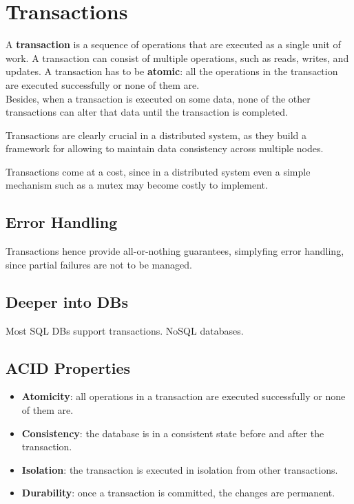 \chapter{Transactions}

\begin{definition}
   [Transaction]
   A \textbf{transaction} is a sequence of operations that are executed as a single unit of work. A transaction can consist of multiple operations, such as reads, writes, and updates.
   A transaction has to be \textbf{atomic}: all the operations in the transaction are executed successfully or none of them are.\\
   Besides, when a transaction is executed on some data, none of the other transactions can alter that data until the transaction is completed.
\end{definition}

Transactions are clearly crucial in a distributed system, as they build a framework for allowing to maintain data consistency across multiple nodes.



Transactions come at a cost, since in a distributed system even a simple mechanism such as a mutex may become costly to implement.

\section{Error Handling}
Transactions hence provide all-or-nothing guarantees, simplyfing error handling, since partial failures are not to be managed.


\section{Deeper into DBs}

Most SQL DBs support transactions.
NoSQL databases.

\section{ACID Properties}

\begin{itemize}
    \item \textbf{Atomicity}: all operations in a transaction are executed successfully or none of them are.
    \item \textbf{Consistency}: the database is in a consistent state before and after the transaction.
    \item \textbf{Isolation}: the transaction is executed in isolation from other transactions.
    \item \textbf{Durability}: once a transaction is committed, the changes are permanent.
\end{itemize}

